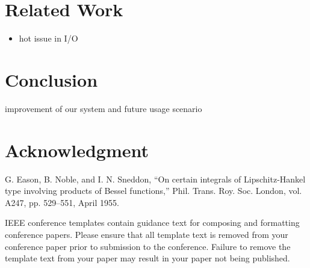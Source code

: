 \documentclass[conference]{IEEEtran}
\begin{document}
\section{Related Work}
\begin{itemize}
	\item hot issue in I/O
\end{itemize}

\section{Conclusion}
improvement of our system and future usage scenario

\section*{Acknowledgment}




\begin{thebibliography}{00}
	 G. Eason, B. Noble, and I. N. Sneddon, ``On certain integrals of Lipschitz-Hankel type involving products of Bessel functions,'' Phil. Trans. Roy. Soc. London, vol. A247, pp. 529--551, April 1955.
\end{thebibliography}
\vspace{12pt}
\color{red}
IEEE conference templates contain guidance text for composing and formatting conference papers. Please ensure that all template text is removed from your conference paper prior to submission to the conference. Failure to remove the template text from your paper may result in your paper not being published.
\end{document}
